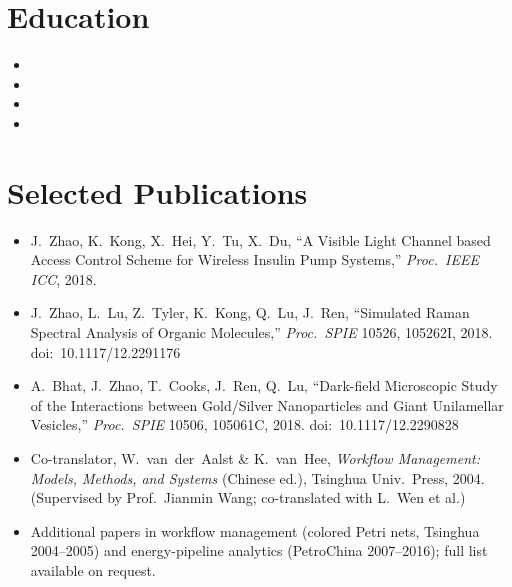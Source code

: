 \documentclass[11pt,a4paper,sans]{moderncv}
\begin{document}
\section{Education}
\vspace{0pt}
\begin{itemize}
\item{}
\vspace{1pt}
\item{}
\vspace{1pt}
\item{}
\vspace{1pt}
\item{}
\end{itemize}

\section{Selected Publications}
\vspace{0pt}
\begin{itemize}
\item J.~Zhao, K.~Kong, X.~Hei, Y.~Tu, X.~Du, ``A Visible Light Channel based Access Control Scheme for Wireless Insulin Pump Systems,'' \textit{Proc.\ IEEE ICC}, 2018.
\item J.~Zhao, L.~Lu, Z.~Tyler, K.~Kong, Q.~Lu, J.~Ren, ``Simulated Raman Spectral Analysis of Organic Molecules,'' \textit{Proc.\ SPIE} 10526, 105262I, 2018. doi:~10.1117/12.2291176
\item A.~Bhat, J.~Zhao, T.~Cooks, J.~Ren, Q.~Lu, ``Dark-field Microscopic Study of the Interactions between Gold/Silver Nanoparticles and Giant Unilamellar Vesicles,'' \textit{Proc.\ SPIE} 10506, 105061C, 2018. doi:~10.1117/12.2290828
\item Co-translator, W.~van~der~Aalst \& K.~van~Hee, \textit{Workflow Management: Models, Methods, and Systems} (Chinese ed.), Tsinghua Univ.\ Press, 2004. (Supervised by Prof.\ Jianmin Wang; co-translated with L.~Wen et al.)
\item Additional papers in workflow management (colored Petri nets, Tsinghua 2004--2005) and energy-pipeline analytics (PetroChina 2007--2016); full list available on request.
\end{itemize}
\end{document}
